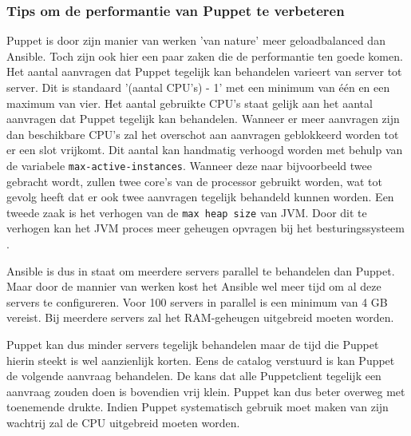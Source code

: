  \subsubsection{Tips om de performantie van Puppet te verbeteren}
 Puppet is door zijn manier van werken 'van nature' meer geloadbalanced dan Ansible. Toch zijn ook hier een paar zaken die de performantie ten goede komen. Het aantal aanvragen dat Puppet tegelijk kan behandelen varieert van server tot server. Dit is standaard '(aantal CPU's) - 1' met een minimum van \'e\'en en een maximum van vier. Het aantal gebruikte CPU's staat gelijk aan het aantal aanvragen dat Puppet tegelijk kan behandelen. Wanneer er meer aanvragen zijn dan beschikbare CPU's zal het overschot aan aanvragen geblokkeerd worden tot er een slot vrijkomt. Dit aantal kan handmatig verhoogd worden met behulp van de variabele \texttt{max-active-instances}. Wanneer deze naar bijvoorbeeld twee gebracht wordt, zullen twee core's van de processor gebruikt worden, wat tot gevolg heeft dat er ook twee aanvragen tegelijk behandeld kunnen worden. \newline
 Een tweede zaak is het verhogen van de \texttt{max heap size} van JVM. Door dit te verhogen kan het JVM proces meer geheugen opvragen bij het besturingssysteem \autocite{PuppetTuning}.
 
 
Ansible is dus in staat om meerdere servers  parallel te behandelen dan Puppet. Maar door de mannier van werken kost het Ansible wel meer  tijd om al deze servers te configureren. Voor 100 servers in parallel is een minimum van 4 GB vereist. Bij meerdere servers zal het RAM-geheugen uitgebreid moeten worden.
 	
 Puppet kan dus minder servers tegelijk behandelen maar de tijd die Puppet hierin steekt is wel aanzienlijk korten. Eens de \gls{catalog} verstuurd is kan Puppet de volgende aanvraag behandelen. De kans dat alle Puppetclient tegelijk een aanvraag zouden doen is bovendien vrij klein. Puppet kan dus beter overweg met toenemende drukte. Indien Puppet systematisch gebruik moet maken van zijn wachtrij zal de CPU uitgebreid moeten worden. 
 
